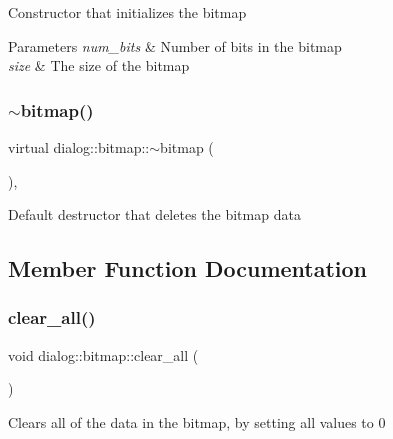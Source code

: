 Constructor that initializes the bitmap 
\begin{DoxyParams}{Parameters}
{\em num\+\_\+bits} & Number of bits in the bitmap \\
\hline
{\em size} & The size of the bitmap \\
\hline
\end{DoxyParams}
\mbox{\label{classdialog_1_1bitmap_a4d7df482fe800db8e7003ea7f1d29df5}} 
\subsubsection{\texorpdfstring{$\sim$bitmap()}{~bitmap()}}
{\footnotesize\ttfamily virtual dialog\+::bitmap\+::$\sim$bitmap (\begin{DoxyParamCaption}{ }\end{DoxyParamCaption})\hspace{0.3cm}{\ttfamily [inline]}, {\ttfamily [virtual]}}

Default destructor that deletes the bitmap data 

\subsection{Member Function Documentation}
\mbox{\label{classdialog_1_1bitmap_a560fd4286efbe1d770926a4ceccc3d9a}} 
\subsubsection{\texorpdfstring{clear\+\_\+all()}{clear\_all()}}
{\footnotesize\ttfamily void dialog\+::bitmap\+::clear\+\_\+all (\begin{DoxyParamCaption}{ }\end{DoxyParamCaption})\hspace{0.3cm}{\ttfamily [inline]}}

Clears all of the data in the bitmap, by setting all values to 0 \mbox{\label{classdialog_1_1bitmap_a0b900d1a8caeda35213c8891e092c61a}} 
